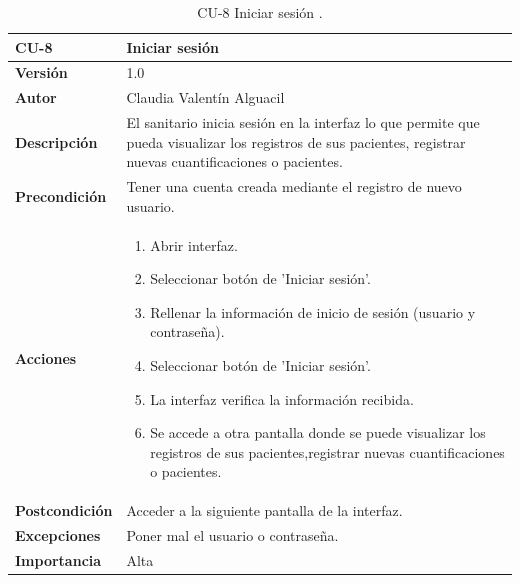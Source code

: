 \begin{table}[p]
	\centering
	\begin{tabularx}{\linewidth}{ p{} p{} }
		\toprule
		\textbf{CU-8}    & \textbf{Iniciar sesión}\\
		\toprule
		\textbf{Versión}              & 1.0    \\
		\textbf{Autor}                & Claudia Valentín Alguacil \\
		 
		\textbf{Descripción}          & El sanitario inicia sesión en la interfaz lo que permite que pueda visualizar los registros de sus pacientes, registrar nuevas cuantificaciones o pacientes. \\
		\textbf{Precondición}         & Tener una cuenta creada mediante el registro de nuevo usuario. \\
		\textbf{Acciones}             &
		\begin{enumerate}
			\def\labelenumi{\arabic{enumi}.}
			\tightlist
                \item Abrir interfaz.
			\item Seleccionar botón de 'Iniciar sesión'.
                \item Rellenar la información de inicio de  sesión (usuario y contraseña).
                \item Seleccionar botón de 'Iniciar sesión'.
			\item La interfaz verifica la información recibida.
                \item Se accede a otra pantalla donde se puede visualizar los registros de sus pacientes,registrar nuevas cuantificaciones o pacientes.
		\end{enumerate}\\
		\textbf{Postcondición}    &  Acceder a la siguiente pantalla de la interfaz.\\
		\textbf{Excepciones}  & Poner mal el usuario o contraseña. \\
		\textbf{Importancia} & Alta \\
		\bottomrule
	\end{tabularx}
	\caption{CU-8 Iniciar sesión .}
\end{table}


